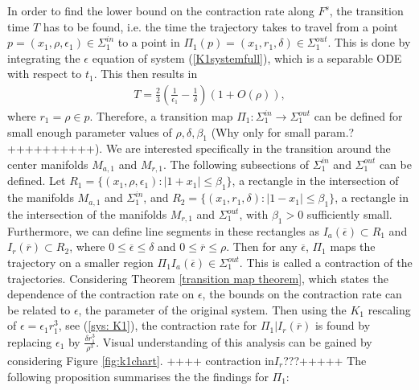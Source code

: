 In order to find the lower bound on the contraction rate along $F^s$, the transition time $T$  has to be found, i.e. the time the trajectory takes to travel from a point $p= (x_1, \rho, \epsilon_1)  \in \Sigma^{in}_1$ to a point in $\Pi_1(p)=( x_1, r_1, \delta) \in \Sigma^{out}_1$. This is done by integrating the $\epsilon$ equation of system (\ref{K1systemfull}), which is a separable ODE with respect to $t_1$.
This then results in 
\begin{align*}
T= \frac{2}{3} \left(\frac{1}{\epsilon_1} - \frac{1}{\delta} \right) \left( 1 + O(\rho) \right),
\end{align*}
where $r_1= \rho \in p$. 
Therefore, a transition map $\Pi_1: \Sigma^{in}_1 \to \Sigma^{out}_1$ can be defined for small enough parameter values of $\rho, \delta, \beta_1$ (Why only for small param.?++++++++++). We are interested specifically in the transition around the center manifolds $M_{a,1}$ and $M_{r,1}$. The following subsections of $\Sigma^{in}_1 $ and $ \Sigma^{out}_1$ can be defined. Let $R_1= \{ (x_1, \rho, \epsilon_1) : |1+ x_1| \leq \beta_1 \}$, a rectangle in the intersection of the manifolds $M_{a,1}$ and  $\Sigma^{in}_1 $, and $R_2= \{ (x_1, r_1, \delta) : |1- x_1| \leq \beta_1 \}$, a rectangle in the intersection of the manifolds $M_{r,1}$ and  $\Sigma^{out}_1 $, with $\beta_1 >0$ sufficiently small. 
Furthermore, we can define line segments in these rectangles as $I_a(\overline{\epsilon}) \subset R_1$ and $I_r(\overline{r}) \subset R_2$, where $0 \leq \overline{\epsilon} \leq \delta$ and $0 \leq \overline{r} \leq \rho$.
Then for any $\overline{\epsilon}$, $\Pi_1$ maps the trajectory on a smaller region $\Pi_1 { I_a(\overline{\epsilon})} \in  \Sigma^{out}_1 $. This is called a contraction of the trajectories.
Considering Theorem \ref{transition map theorem}, which states the dependence of the contraction rate on $\epsilon$, the bounds on the contraction rate can be related to $\epsilon$, the parameter of the original system. Then using the $K_1$ rescaling of $\epsilon= \epsilon_1 r_1^3$, see (\ref{sys: K1}),  the contraction rate for $\Pi_1 |I_r(\overline{r})$ is found by replacing $\epsilon_1$ by $\frac{\delta r^3_1}{\rho^3}$. 
Visual understanding of this analysis can be gained by considering Figure \ref{fig:k1chart}.
++++ contraction in$ I_r$???+++++ 
The following proposition summarises the the findings for $\Pi_1$:
